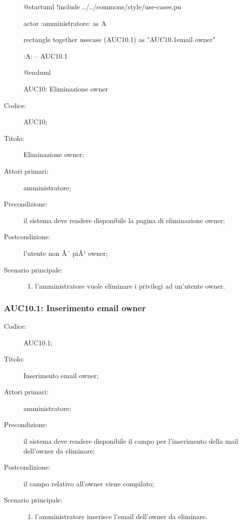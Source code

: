 \documentclass[../../../analisi-dei-requisiti.tex]{subfiles}
\begin{document}
\begin{figure}[H]
  \centering
  \begin{plantuml}
  @startuml
  !include ../../commons/style/use-cases.pu

  actor :amministratore: as A

  rectangle {
    together {
      usecase (AUC10.1) as "AUC10.1\nInserimento email owner"
    }
  }

  :A: -- AUC10.1

  @enduml
  \end{plantuml}
  \caption{AUC10: Eliminazione owner}%
  \label{fig:AUC10}
\end{figure}

\begin{description}
  \item[Codice:] AUC10;
  \item[Titolo:] Eliminazione owner;
  \item[Attori primari:] amministratore;
  \item[Precondizione:] il sistema deve rendere disponibile la pagina di eliminazione owner;
  \item[Postcondizione:] l'utente non Ã¨ piÃ¹ owner;
  \item[Scenario principale:]
  \begin{enumerate}
    \item l'amministratore vuole eliminare i privilegi ad un'utente owner.
  \end{enumerate}
\end{description}

\subsubsection{AUC10.1: Inserimento email owner}%
\label{subs:AUC10.1}
\begin{description}
  \item[Codice:] AUC10.1;
  \item[Titolo:] Inserimento email owner;
  \item[Attori primari:] amministratore;
  \item[Precondizione:] il sistema deve rendere disponibile il campo per l'inserimento della mail dell'owner da eliminare;
  \item[Postcondizione:] il campo relativo all'owner viene compilato;
  \item[Scenario principale:]
  \begin{enumerate}
    \item l'amministratore inserisce l'email dell'owner da eliminare.
  \end{enumerate}
\end{description}
\end{document}
